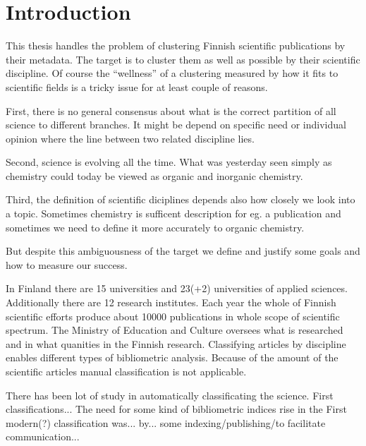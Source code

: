 \chapter{Introduction}
\label{chapter:intro}
    
This thesis handles the problem of clustering Finnish scientific 
publications by their metadata. The target is to cluster 
them as well as possible by their scientific discipline. Of course 
the ``wellness'' of a clustering measured by how it fits to 
scientific fields is a tricky issue for at least couple of reasons.

First, there is no general consensus about what is the correct 
partition of all science to different branches. It might be depend 
on specific need or individual opinion where the line between two 
related discipline lies.

Second, science is evolving all the time. What was yesterday seen 
simply as chemistry could today be viewed as organic and inorganic 
chemistry.

Third, the definition of scientific diciplines depends also how 
closely we look into a topic. Sometimes chemistry is sufficent 
description for eg. a publication and sometimes we need to define 
it more accurately to organic chemistry.

But despite this ambiguousness of the target we define and 
justify some goals and how to measure our success.


In Finland there are 15 universities and 23(+2) universities of 
applied sciences. Additionally there are 12 research institutes.
Each year the whole of Finnish scientific efforts produce about 
10000 publications in whole scope of scientific spectrum. 
 The Ministry of 
Education and Culture oversees what is researched and in what 
quanities in the Finnish research.
Classifying articles by discipline enables different types of 
bibliometric analysis.
Because of the amount of the scientific articles manual 
classification is not applicable. 

There has been lot of study in automatically classificating the 
science.
First classifications...
The need for some kind of bibliometric indices rise in the 
First modern(?) classification was... by... some 
indexing/publishing/to facilitate communication...

